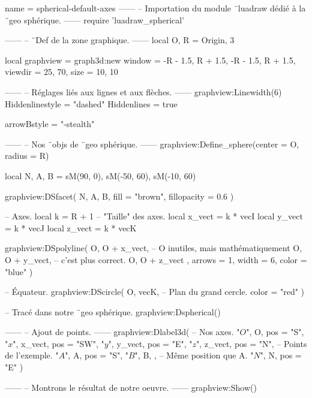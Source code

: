 \documentclass{standalone}
\begin{document}
\begin{luadraw}{name = spherical-default-axes}
------
-- Importation du module ¨luadraw dédié à la ¨geo sphérique.
------
require 'luadraw_spherical'

------
-- ¨Def de la zone graphique.
------
local O, R = Origin, 3

local graphview = graph3d:new{
  window  = {-R - 1.5, R + 1.5, -R - 1.5, R + 1.5},
  viewdir = {25, 70},
  size    = {10, 10}
}

------
-- Réglages liés aux lignes et aux flèches.
------
graphview:Linewidth(6)
Hiddenlinestyle = "dashed"
Hiddenlines     = true

arrowBstyle = "-stealth"

------
-- Nos ¨objs de ¨geo sphérique.
------
graphview:Define_sphere({center = O, radius = R})

local N, A, B = sM(90, 0), sM(-50, 60), sM(-10, 60)

graphview:DSfacet(
  {N, A, B},
  {fill = "brown", fillopacity = 0.6}
)

-- Axes.
local k      = R + 1     -- "Taille" des axes.
local x_vect = k * vecI
local y_vect = k * vecJ
local z_vect = k * vecK

graphview:DSpolyline(
  {
    {O, O + x_vect},  -- O inutiles, mais mathématiquement
    {O, O + y_vect},  -- c'est plus correct.
    {O, O + z_vect}
  },
  {arrows = 1, width = 6, color = "blue"}
)

-- Équateur.
graphview:DScircle(
  {O, vecK},       -- Plan du grand cercle.
  {color = "red"}
)

-- Tracé dans notre ¨geo sphérique.
graphview:Dspherical()

------
-- Ajout de points.
------
graphview:Dlabel3d(
-- Nos axes.
  "$O$", O, {pos = "S"},
  "$x$", x_vect, {pos = "SW"},
  "$y$", y_vect, {pos = "E"},
  "$z$", z_vect, {pos = "N"},
-- Points de l'exemple.
  "$A$", A, {pos = "S"},
  "$B$", B, {},           -- Même position que A.
  "$N$", N, {pos = "E"}
)

------
-- Montrons le résultat de notre oeuvre.
------
graphview:Show()
\end{luadraw}
\end{document}
